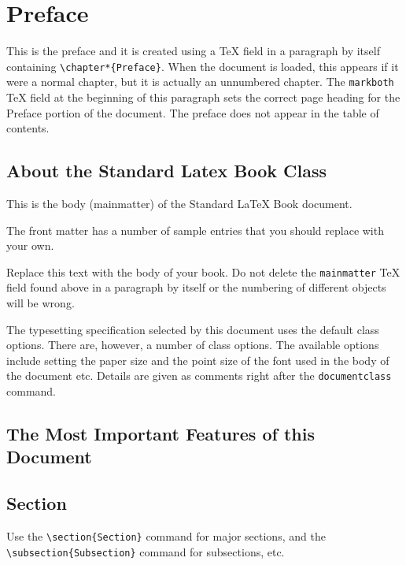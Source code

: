 \chapter*{Preface}

This is the preface and it is created using a TeX field in a
paragraph by itself containing \verb|\chapter*{Preface}|. When the
document is loaded, this appears if it were a normal chapter, but
it is actually an unnumbered chapter. The \verb|markboth| TeX
field at the beginning of this paragraph sets the correct page
heading for the Preface portion of the document. The preface does
not appear in the table of contents.

\section{About the Standard Latex Book Class}

This is the body (mainmatter) of the Standard LaTeX Book document.

The front matter has a number of sample entries that you should
replace with your own.

Replace this text with the body of your book. Do not delete the
\verb|mainmatter| TeX field found above in a paragraph by itself
or the numbering of different objects will be wrong.

The typesetting specification selected by this document uses the
default class options. There are, however, a number of class
options. The available options include setting the paper size and
the point size of the font used in the body of the document etc.
Details are given as comments right after the \verb|documentclass|
command.

\section{The Most Important Features of this Document}

\section{Section}

Use the \verb"\section{Section}" command for major sections, and the
\verb"\subsection{Subsection}" command for subsections, etc.

